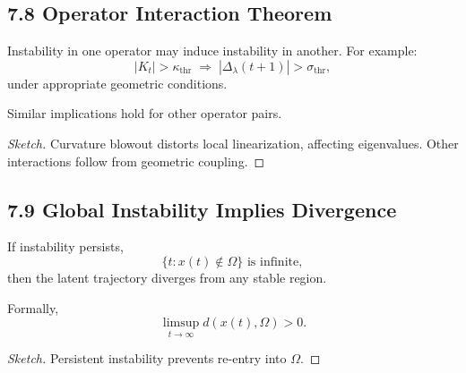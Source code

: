 \subsection*{7.8 Operator Interaction Theorem}

\begin{theorem}
Instability in one operator may induce instability in another. For
example:
\[
|K_t| > \kappa_{\mathrm{thr}}
\;\Rightarrow\;
|\Delta_\lambda(t+1)| > \sigma_{\mathrm{thr}},
\]
under appropriate geometric conditions.

Similar implications hold for other operator pairs.
\end{theorem}

\begin{proof}[Sketch]
Curvature blowout distorts local linearization, affecting eigenvalues.
Other interactions follow from geometric coupling.
\end{proof}

\subsection*{7.9 Global Instability Implies Divergence}

\begin{theorem}
If instability persists,
\[
\{ t : x(t) \notin \Omega \} \text{ is infinite},
\]
then the latent trajectory diverges from any stable region.

Formally,
\[
\limsup_{t \to \infty} d(x(t), \Omega) > 0.
\]
\end{theorem}

\begin{proof}[Sketch]
Persistent instability prevents re-entry into $\Omega$.
\end{proof}


